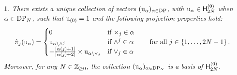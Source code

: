\documentclass[oneside,english]{amsart}
\numberwithin{equation}{section}
\numberwithin{figure}{section}
\theoremstyle{plain}
\theoremstyle{plain}
\theoremstyle{plain}
\theoremstyle{remark}
\theoremstyle{plain}
\newtheorem{prop}[lem]{\protect\propositionname}
\theoremstyle{plain}
\theoremstyle{plain}
\theoremstyle{plain}
\theoremstyle{plain}
\theoremstyle{plain}
\theoremstyle{plain}
\theoremstyle{plain}
\providecommand{\propositionname}{Proposition}
\newcommand{\red}[1]{{\color{red} #1}}
\begin{document}
\begin{prop}\label{prop: conformal block vectors}
There exists a unique collection of vectors $( \mathrm{u}_\alpha )_{\alpha \in \mathrm{DP}}$, 
with $\mathrm{u}_\alpha \in \mathsf{H}_{2N}^{(0)}$ 
when $\alpha \in \mathrm{DP}_N$,
such that $\mathrm{u}_{(0)} = 1$ and the following projection properties hold:
\begin{align}
& \hat{\pi}_j(\mathrm{u}_\alpha) =
\label{eq: coblo walk projection conditions}
\begin{cases} 
0 & \text{if } \times_j \in \alpha \\
\mathrm{u}_{\alpha\setminus \wedge^j} 
& \text{if } \wedge^j \in \alpha \\
- \frac{\left[\alpha(j)+1\right]}{\left[\alpha(j)+2\right]} \times
\mathrm{u}_{\alpha \setminus \vee_j} 
& \text{if } \vee_j \in \alpha
\end{cases}
\qquad\text{for all } j \in \left\{ 1,\ldots,2N-1\right\}.
\end{align}
Moreover, for any $N \in \mathbb{Z}_{\geq 0}$, the collection $( \mathrm{u}_\alpha )_{\alpha \in \mathrm{DP}_N}$ is a basis of $\mathsf{H}_{2N}^{(0)}$.
\end{prop}
\end{document}
